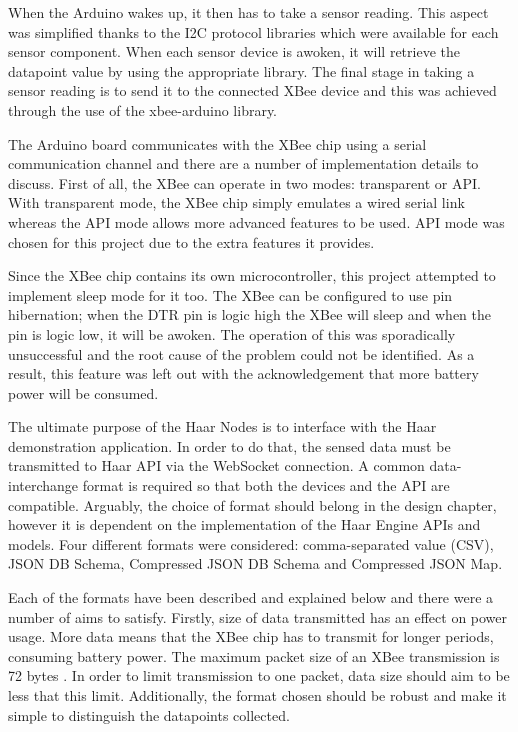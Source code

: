       When the Arduino wakes up, it then has to take a sensor reading. This aspect was simplified thanks to the I2C protocol libraries which were available for each sensor component. When each sensor device is awoken, it will retrieve the datapoint value by using the appropriate library. The final stage in taking a sensor reading is to send it to the connected XBee device and this was achieved through the use of the xbee-arduino library.

      The Arduino board communicates with the XBee chip using a serial communication channel and there are a number of implementation details to discuss. First of all, the XBee can operate in two modes: transparent or API. With transparent mode, the XBee chip simply emulates a wired serial link whereas the API mode allows more advanced features to be used. API mode was chosen for this project due to the extra features it provides.

      Since the XBee chip contains its own microcontroller, this project attempted to implement sleep mode for it too. The XBee can be configured to use pin hibernation; when the DTR pin is logic high the XBee will sleep and when the pin is logic low, it will be awoken. The operation of this was sporadically unsuccessful and the root cause of the problem could not be identified. As a result, this feature was left out with the acknowledgement that more battery power will be consumed.

      The ultimate purpose of the Haar Nodes is to interface with the Haar demonstration application. In order to do that, the sensed data must be transmitted to Haar API via the WebSocket connection. A common data-interchange format is required so that both the devices and the API are compatible. Arguably, the choice of format should belong in the design chapter, however it is dependent on the implementation of the Haar Engine APIs and models. Four different formats were considered: comma-separated value (CSV), JSON DB Schema, Compressed JSON DB Schema and Compressed JSON Map.

      Each of the formats have been described and explained below and there were a number of aims to satisfy. Firstly, size of data transmitted has an effect on power usage. More data means that the XBee chip has to transmit for longer periods, consuming battery power. The maximum packet size of an XBee transmission is 72 bytes \citep{xbee-packet-size}. In order to limit transmission to one packet, data size should aim to be less that this limit. Additionally, the format chosen should be robust and make it simple to distinguish the datapoints collected.\\

